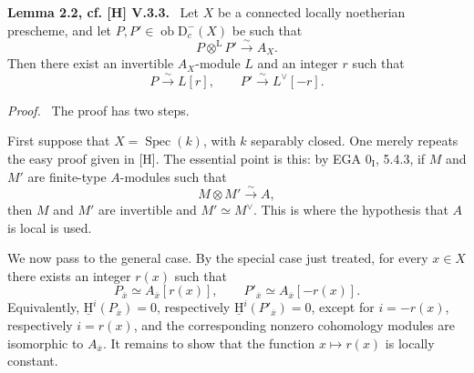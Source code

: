 \documentclass[11pt]{article}
\providecommand{\uH}{\underline{\mathrm H}}
\newenvironment{statement}[1]{\par\medskip\noindent\textbf{#1.}\ }{\par\medskip}
\newenvironment{prooftext}[1][Proof]{\par\noindent\emph{#1.}\ }{\par\medskip}
\DeclareMathOperator{\Spec}{Spec}
\newcommand{\D}{\mathrm{D}}
\newcommand{\ob}{\operatorname{ob}}
\newcommand{\ol}[1]{\overline{#1}}
\providecommand{\ob}{\operatorname{ob}}
\providecommand{\Spec}{\operatorname{Spec}}
\providecommand{\Spec}{\operatorname{Spec}}
\providecommand{\Spec}{\operatorname{Spec}}
\providecommand{\Spec}{\operatorname{Spec}}
\begin{document}
\label{sga5:I:lemma:2.2}\begin{statement}{Lemma 2.2, cf. [H] V.3.3}
Let $X$ be a connected locally noetherian prescheme, and let $P,P'\in\ob\D_c^-(X)$ be such that
\[
   P\otimes^{\mathrm L}P'\xrightarrow{\sim}A_X.
\]
Then there exist an invertible $A_X$-module $L$ and an integer $r$ such that
\[
   P\xrightarrow{\sim}L[r],\qquad P'\xrightarrow{\sim}L^\vee[-r].
\]
\end{statement}

\begin{prooftext}
The proof has two steps.

First suppose that $X=\Spec(k)$, with $k$ separably closed. One merely repeats the easy proof given in [H]. The essential point is this: by EGA $0_{\mathrm I}$, 5.4.3, if $M$ and $M'$ are finite-type $A$-modules such that
\[
   M\otimes M'\xrightarrow{\sim}A,
\]
then $M$ and $M'$ are invertible and $M'\simeq M^\vee$. This is where the hypothesis that $A$ is local is used.

We now pass to the general case. By the special case just treated, for every $x\in X$ there exists an integer $r(x)$ such that
\[
   P_{\ol{x}}\simeq A_{\ol{x}}[r(x)],\qquad
   P'_{\ol{x}}\simeq A_{\ol{x}}[-r(x)].
\]
Equivalently, $\uH^i(P_{\ol{x}})=0$, respectively $\uH^i(P'_{\ol{x}})=0$, except for $i=-r(x)$, respectively $i=r(x)$, and the corresponding nonzero cohomology modules are isomorphic to $A_{\ol{x}}$. It remains to show that the function $x\mapsto r(x)$ is locally constant.


\end{prooftext}
\end{document}
